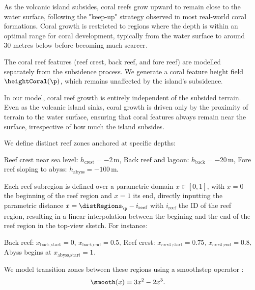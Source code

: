 As the volcanic island subsides, coral reefs grow upward to remain close to the water surface, following the "keep-up" strategy observed in most real-world coral formations. Coral growth is restricted to regions where the depth is within an optimal range for coral development, typically from the water surface to around 30 metres below before becoming much scarcer.

The coral reef features (reef crest, back reef, and fore reef) are modelled separately from the subsidence process. We generate a coral feature height field $\heightCoral(\p)$, which remains unaffected by the island's subsidence. %

In our model, coral reef growth is entirely independent of the subsided terrain. Even as the volcanic island sinks, coral growth is driven only by the proximity of terrain to the water surface, ensuring that coral features always remain near the surface, irrespective of how much the island subsides.

We define distinct reef zones anchored at specific depths:

\begin{Itemize}
    \Item{} Reef crest near sea level: $h_{\text{crest}} = -2$\,m,
    \Item{} Back reef and lagoon: $h_{\text{back}} = -20$\,m,
    \Item{} Fore reef sloping to abyss: $h_{\text{abyss}} = -100$\,m.
\end{Itemize}

Each reef subregion is defined over a parametric domain $x \in [0, 1]$, with $x = 0$ the beginning of the reef region and $x = 1$ its end, directly inputting the parametric distance $x = \distRegions_\p - i_{\text{reef}}$ with $i_{\text{reef}}$ the ID of the reef region, resulting in a linear interpolation between the begining and the end of the reef region in the top-view sketch. For instance:
\begin{Itemize}
    \Item{} Back reef: $x_{\text{back,start}} = 0$, $x_{\text{back,end}} = 0.5$,
    \Item{} Reef crest: $x_{\text{crest,start}} = 0.75$, $x_{\text{crest,end}} = 0.8$,
    \Item{} Abyss begins at $x_{\text{abyss,start}} = 1$.
\end{Itemize}

We model transition zones between these regions using a smoothstep operator \cite{Perlin2002}:
\begin{align*}
    \smooth(x) = 3x^2 - 2x^3.
\end{align*}

